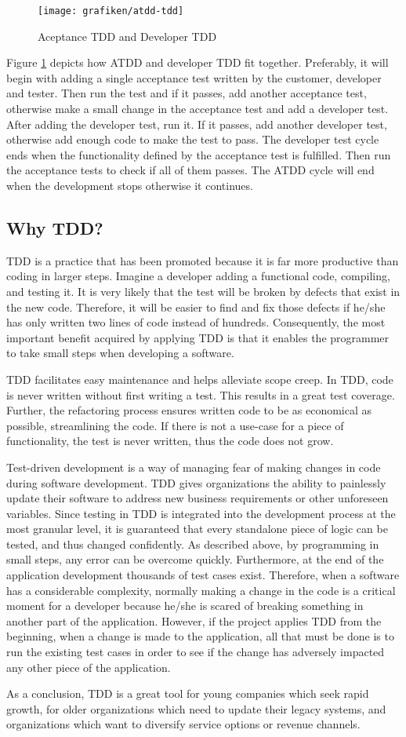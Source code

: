 \begin{figure}[H]
	\centering
    \texttt{[image: grafiken/atdd-tdd]}
    \caption{Aceptance TDD and Developer TDD\cite{Ambler2013}}
    \label{fig:atdd-tdd}
\end{figure}  

Figure \ref{fig:atdd-tdd} depicts how ATDD and developer TDD fit together. Preferably, it will begin with adding a single acceptance test written by the customer, developer and tester. Then run the test and if it passes, add another acceptance test, otherwise make a small change in the acceptance test and add a developer test. After adding the developer test, run it. If it passes, add another developer test, otherwise add enough code to make the test to pass. The developer test cycle ends when the functionality defined by the acceptance test is fulfilled. Then run the acceptance tests to check if all of them passes. The ATDD cycle will end when the development stops otherwise it continues.

\subsection{Why TDD?}
TDD is a practice that has been promoted because it is far more productive than coding in larger steps\citep{Ambler2013}. Imagine a developer adding a functional code, compiling, and testing it. It is very likely that the test will be broken by defects that exist in the new code. Therefore, it will be easier to find and fix those defects if he/she has only written two lines of code instead of hundreds. Consequently, the most important benefit acquired by applying TDD is that it enables the programmer to take small steps when developing a software.

TDD facilitates easy maintenance and helps alleviate scope creep. In TDD, code is never written without first writing a test. This results in a great test coverage. Further, the refactoring process ensures written code to be as economical as possible, streamlining the code. If there is not a use-case for a piece of functionality, the test is never written, thus the code does not grow.

Test-driven development is a way of managing fear of making changes in code during software development\cite{Beck2003}. TDD gives organizations the ability to painlessly update their software to address new business requirements or other unforeseen variables. Since testing in TDD is integrated into the development process at the most granular level, it is guaranteed that every standalone piece of logic can be tested, and thus changed confidently. As described above, by programming in small steps, any error can be overcome quickly. Furthermore, at the end of the application development thousands of test cases exist. Therefore, when a software has a considerable complexity, normally making a change in the code is a critical moment for a developer because he/she is scared of breaking something in another part of the application. However, if the project applies TDD from the beginning, when a change is made to the application, all that must be done is to run the existing test cases in order to see if the change has adversely impacted any other piece of the application.

As a conclusion, TDD is a great tool for young companies which seek rapid growth, for older organizations which need to update their legacy systems, and organizations which want to diversify service options or revenue channels.
